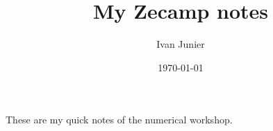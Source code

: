 \documentclass[12pt]{article}
\begin{document}
\title{My Zecamp notes}
\author{Ivan Junier}
\date{\today}

\maketitle

These are my quick notes of the numerical workshop.  
\end{document}
